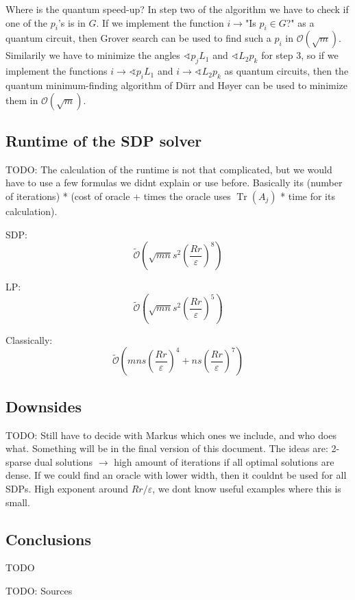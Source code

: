 \documentclass[11pt,a4paper]{scrartcl}
\DeclareMathOperator{\Tr}{Tr}
\begin{document}
Where is the quantum speed-up? In step two of the algorithm we have to check if one of the $p_i$'s is in $G$. If we implement the function $i\to$"Is $p_i\in G$?" as a  quantum circuit, then Grover search can be used to find such a $p_i$ in $\mathcal{O}(\sqrt{m})$. Similarily we have to minimize the angles $\sphericalangle p_j L_1$ and $\sphericalangle L_2 p_k$ for step 3, so if we implement the functions $i\to\sphericalangle p_i L_1$ and $i\to \sphericalangle L_2 p_k$ as quantum circuits, then the quantum minimum-finding algorithm of Dürr and Høyer can be used to minimize them in $\mathcal{O}(\sqrt{m})$.


\subsection{Runtime of the SDP solver}

TODO: The calculation of the runtime is not that complicated, but we would have to use a few formulas we didnt explain or use before. Basically its (number of iterations) * (cost of oracle + times the oracle uses $\Tr(A_j)$ * time for its calculation). 

SDP:
\begin{equation*}
\tilde{\mathcal{O}}\left(\sqrt{mn}s^2\left(\frac{Rr}{\varepsilon}\right)^8\right)
\end{equation*}

LP:
\begin{equation*}
\tilde{\mathcal{O}}\left(\sqrt{mn}s^2\left(\frac{Rr}{\varepsilon}\right)^5\right)
\end{equation*}

Classically:
\begin{equation*}
\tilde{\mathcal{O}}\left(mns\left(\frac{Rr}{\varepsilon}\right)^4+ns\left(\frac{Rr}{\varepsilon}\right)^7\right)
\end{equation*}

\subsection{Downsides}
TODO: Still have to decide with Markus which ones we include, and who does what. Something will be in the final version of this document. The ideas are: 2-sparse dual solutions $\rightarrow$ high amount of iterations if all optimal solutions are dense. If we could find an oracle with lower width, then it couldnt be used for all SDPs. High exponent around $Rr/\varepsilon$, we dont know useful examples where this is small.

\subsection{Conclusions}
TODO

\vspace{1cm}
TODO: Sources

\printbibliography
\end{document}
